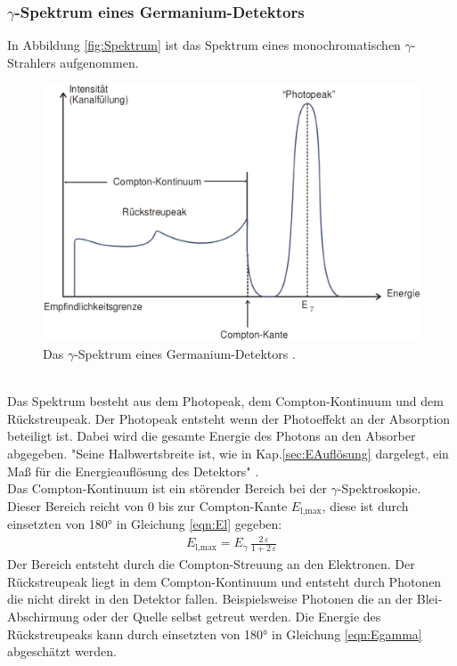 \subsubsection{\texorpdfstring{$\gamma$}{}-Spektrum eines Germanium-Detektors}
In Abbildung \eqref{fig:Spektrum} ist das Spektrum eines monochromatischen $\gamma$-Strahlers aufgenommen.

\begin{figure} %
	\centering
	\includegraphics[width=0.8\linewidth]{Bilder/Spektrum.png}
	\caption{Das $\gamma$-Spektrum eines Germanium-Detektors \cite{V18}.}
	\label{fig:Spektrum}
\end{figure}
 \\
Das Spektrum besteht aus dem Photopeak, dem Compton-Kontinuum und dem Rückstreupeak. Der Photopeak entsteht wenn der Photoeffekt an der Absorption beteiligt ist. Dabei wird die gesamte Energie des Photons an den Absorber abgegeben. "Seine Halbwertsbreite ist, wie in Kap.\ref{sec:EAuflösung} dargelegt, ein Maß für die Energieauflösung des Detektors" \cite[22]{V18}. \\
Das Compton-Kontinuum ist ein störender Bereich bei der $\gamma$-Spektroskopie. Dieser Bereich reicht von 0 bis zur Compton-Kante $E_\text{l,max}$, diese ist durch einsetzten von 180° in Gleichung \eqref{eqn:El} gegeben:
\begin{align}
	E_\text{l,max}= E_\gamma \, \frac{2\,\varepsilon} {1 + 2\,\varepsilon}
	\label{eqn:Comptonkante}
\end{align}
Der Bereich entsteht durch die Compton-Streuung an den Elektronen. Der Rückstreupeak liegt in dem Compton-Kontinuum und entsteht durch Photonen die nicht direkt in den Detektor fallen. Beispielsweise Photonen die an der Blei-Abschirmung oder der Quelle selbst getreut werden. Die Energie des Rückstreupeaks kann durch einsetzten von 180° in Gleichung \eqref{eqn:Egamma} abgeschätzt werden.



